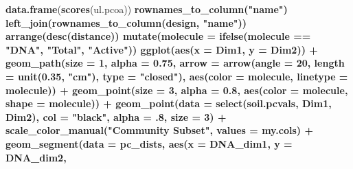 \documentclass[]{article}
\newenvironment{Shaded}{\begin{snugshade}}{\end{snugshade}}
\newcommand{\KeywordTok}[1]{\textcolor[rgb]{0.13,0.29,0.53}{\textbf{#1}}}
\newcommand{\DataTypeTok}[1]{\textcolor[rgb]{0.13,0.29,0.53}{#1}}
\newcommand{\DecValTok}[1]{\textcolor[rgb]{0.00,0.00,0.81}{#1}}
\newcommand{\FloatTok}[1]{\textcolor[rgb]{0.00,0.00,0.81}{#1}}
\newcommand{\StringTok}[1]{\textcolor[rgb]{0.31,0.60,0.02}{#1}}
\newcommand{\OperatorTok}[1]{\textcolor[rgb]{0.81,0.36,0.00}{\textbf{#1}}}
\newcommand{\NormalTok}[1]{#1}
\begin{document}
\begin{Shaded}
\begin{Highlighting}[]
{{{{{{{{\KeywordTok{data.frame}\NormalTok{(}\KeywordTok{scores}\NormalTok{(ul.pcoa)) }\OperatorTok{%
\StringTok{  }\KeywordTok{rownames_to_column}\NormalTok{(}\StringTok{"name"}\NormalTok{) }\OperatorTok{%
\StringTok{  }\KeywordTok{left_join}\NormalTok{(}\KeywordTok{rownames_to_column}\NormalTok{(design, }\StringTok{"name"}\NormalTok{)) }\OperatorTok{%
\StringTok{  }\KeywordTok{arrange}\NormalTok{(}\KeywordTok{desc}\NormalTok{(distance)) }\OperatorTok{%
\StringTok{  }\KeywordTok{mutate}\NormalTok{(}\DataTypeTok{molecule =} \KeywordTok{ifelse}\NormalTok{(molecule }\OperatorTok{==}\StringTok{ "DNA"}\NormalTok{, }\StringTok{"Total"}\NormalTok{, }\StringTok{"Active"}\NormalTok{)) }\OperatorTok{%
\StringTok{  }\KeywordTok{ggplot}\NormalTok{(}\KeywordTok{aes}\NormalTok{(}\DataTypeTok{x =}\NormalTok{ Dim1, }\DataTypeTok{y =}\NormalTok{ Dim2)) }\OperatorTok{+}
\StringTok{  }\KeywordTok{geom_path}\NormalTok{(}\DataTypeTok{size =} \DecValTok{1}\NormalTok{, }\DataTypeTok{alpha =} \FloatTok{0.75}\NormalTok{, }\DataTypeTok{arrow =} \KeywordTok{arrow}\NormalTok{(}\DataTypeTok{angle =} \DecValTok{20}\NormalTok{,}
                          \DataTypeTok{length =} \KeywordTok{unit}\NormalTok{(}\FloatTok{0.35}\NormalTok{, }\StringTok{"cm"}\NormalTok{),}
                          \DataTypeTok{type =} \StringTok{"closed"}\NormalTok{), }\KeywordTok{aes}\NormalTok{(}\DataTypeTok{color =}\NormalTok{ molecule, }\DataTypeTok{linetype =}\NormalTok{ molecule)) }\OperatorTok{+}
\StringTok{  }\KeywordTok{geom_point}\NormalTok{(}\DataTypeTok{size =} \DecValTok{3}\NormalTok{, }\DataTypeTok{alpha =} \FloatTok{0.8}\NormalTok{, }\KeywordTok{aes}\NormalTok{(}\DataTypeTok{color =}\NormalTok{ molecule, }\DataTypeTok{shape =}\NormalTok{ molecule)) }\OperatorTok{+}\StringTok{ }
\StringTok{  }\KeywordTok{geom_point}\NormalTok{(}\DataTypeTok{data =} \KeywordTok{select}\NormalTok{(soil.pcvals, Dim1, Dim2), }\DataTypeTok{col =} \StringTok{"black"}\NormalTok{, }\DataTypeTok{alpha =}\NormalTok{ .}\DecValTok{8}\NormalTok{, }\DataTypeTok{size =} \DecValTok{3}\NormalTok{) }\OperatorTok{+}
\StringTok{  }\KeywordTok{scale_color_manual}\NormalTok{(}\StringTok{"Community Subset"}\NormalTok{, }\DataTypeTok{values =}\NormalTok{ my.cols) }\OperatorTok{+}
\StringTok{  }\KeywordTok{geom_segment}\NormalTok{(}\DataTypeTok{data =}\NormalTok{ pc_dists,}
               \KeywordTok{aes}\NormalTok{(}\DataTypeTok{x =}\NormalTok{ DNA_dim1, }\DataTypeTok{y =}\NormalTok{ DNA_dim2,}
}}}}}}}}}}}}}
\end{Highlighting}
\end{Shaded}
\end{document}
